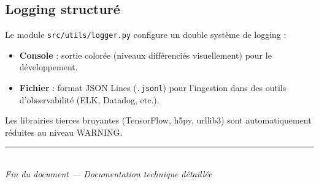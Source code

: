 ﻿\documentclass[11pt,a4paper]{article}
\begin{document}
\subsection{Logging structuré}

Le module \texttt{src/utils/logger.py} configure un double système de logging :
\begin{itemize}[leftmargin=2em]
  \item \textbf{Console} : sortie colorée (niveaux différenciés visuellement) pour le développement.
  \item \textbf{Fichier} : format JSON Lines (\texttt{.jsonl}) pour l'ingestion dans des outils d'observabilité (ELK, Datadog, etc.).
\end{itemize}

Les librairies tierces bruyantes (TensorFlow, h5py, urllib3) sont automatiquement réduites au niveau WARNING.

\vfill
\begin{center}
\textcolor{accent}{\rule{0.5\textwidth}{0.5pt}}\\[0.5em]
\textit{Fin du document --- Documentation technique détaillée}
\end{center}
\end{document}
